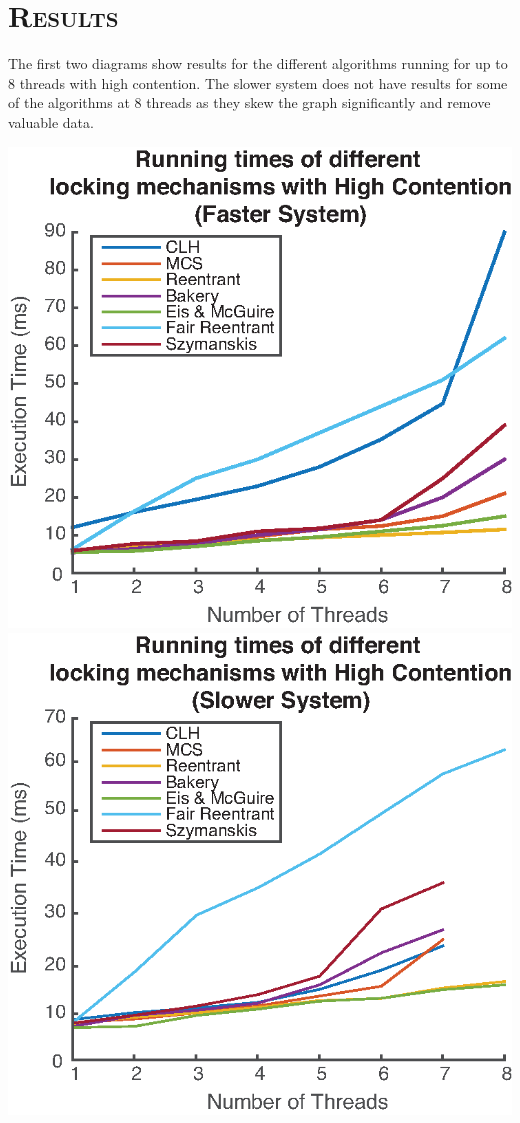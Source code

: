\documentclass[FinalReport.tex]{subfiles}
\begin{document}
\bigskip

\section*{\textsc{\Large Results}}

The first two diagrams show results for the different algorithms running for up to 8 threads with high contention. The slower system does not have results for some of the algorithms at 8 threads as they skew the graph significantly and remove valuable data.


\bigskip


	\includegraphics[scale = .8]{myComp_1-8_1000.eps}
	\includegraphics[scale = .8]{evanComp_1-8_1000.eps}
\end{document}
